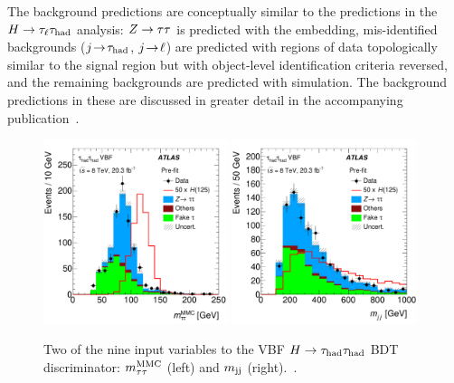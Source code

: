 The background predictions are conceptually similar to the predictions in the $H\rightarrow\tau_\ell\tau_\text{had}$ analysis: $Z\rightarrow\tau\tau$ is predicted with the embedding, mis-identified backgrounds ($j\!\rightarrow\!\tau_\text{had}$, $j\!\rightarrow\!\ell$) are predicted with regions of data topologically similar to the signal region but with object-level identification criteria reversed, and the remaining backgrounds are predicted with simulation. The background predictions in these are discussed in greater detail in the accompanying publication~\cite{HIGG-2013-32}.

\begin{figure}[tp]
  \centering
  \includegraphics[width=0.48\textwidth]{figures/HIGG-2013-32/figaux_09d}
  \includegraphics[width=0.48\textwidth]{figures/HIGG-2013-32/figaux_09c}
  \caption{Two of the nine input variables to the VBF $H\rightarrow\tau_\text{had}\tau_\text{had}$ BDT discriminator: $m_{\tau\tau}^\text{MMC}$ (left) and $m_{\text{jj}}$ (right).~\cite{HIGG-2013-32}.}
  \label{fig:backgrounds-hadhad}
\end{figure}

